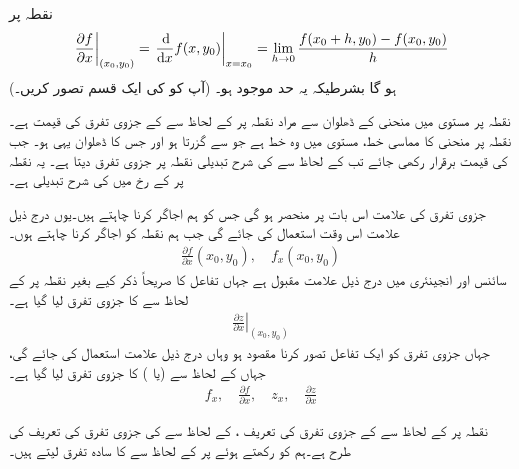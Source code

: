 نقطہ  پر
\begin{align}\label{مساوات_کثیرالمتغیر_جزوی_تفرق_الف}
\left.\frac{\partial f}{\partial x}\right\vert_{(x_0,y_0)}=\left.\frac{\dif}{\dif x}f(x,y_0)\right\vert_{x=x_0}=\lim_{h\to 0}\frac{f(x_0+h,y_0)-f(x_0,y_0)}{h}
\end{align}
ہو گا بشرطیکہ  یہ حد موجود ہو۔ (آپ  کو  کی ایک قسم تصور کریں۔)

نقطہ  پر مستوی  میں منحنی  کے ڈھلوان  سے مراد نقطہ  پر  کے لحاظ سے  کے جزوی تفرق کی قیمت ہے۔  نقطہ  پر منحنی کا مماسی خط، مستوی  میں وہ خط ہے جو  سے گزرتا ہو اور جس  کا ڈھلوان یہی ہو۔ جب  کی قیمت برقرار  رکھی جائے  تب  کے لحاظ سے  کی شرح تبدیلی نقطہ  پر جزوی تفرق     دیتا ہے۔ یہ نقطہ  پر  کے رخ میں   کی شرح تبدیلی  ہے۔

جزوی تفرق کی علامت اس بات    پر منحصر ہو گی جس  کو ہم اجاگر کرنا چاہتے ہیں۔یوں درج ذیل علامت اس وقت استعمال کی  جائے گی جب ہم نقطہ  کو   اجاگر کرنا  چاہتے ہوں۔
\begin{align*}
\frac{\partial f}{\partial x}(x_0,y_0),\quad f_x(x_0,y_0)
\end{align*}
سائنس اور انجینئری میں درج ذیل علامت مقبول ہے جہاں تفاعل کا صریحاً  ذکر  کیے  بغیر نقطہ  پر  کے لحاظ سے   کا  جزوی تفرق لیا  گیا ہے۔
\begin{align*}
\left.\frac{\partial z}{\partial x}\right\vert_{(x_0,y_0)}
\end{align*}
جہاں جزوی تفرق  کو ایک تفاعل تصور کرنا مقصود  ہو وہاں درج ذیل علامت استعمال کی جائے گی، جہاں    کے لحاظ سے  (یا ) کا  جزوی تفرق  لیا گیا ہے۔
\begin{align*}
f_x,\quad \frac{\partial f}{\partial x},\quad z_x,\quad \frac{\partial z}{\partial x}
\end{align*}

نقطہ  پر  کے لحاظ سے  کے جزوی تفرق کی تعریف ،  کے لحاظ سے  کی جزوی تفرق کی تعریف کی طرح ہے۔ہم  کو  رکھتے ہوئے  پر  کے لحاظ سے  کا سادہ تفرق لیتے ہیں۔


